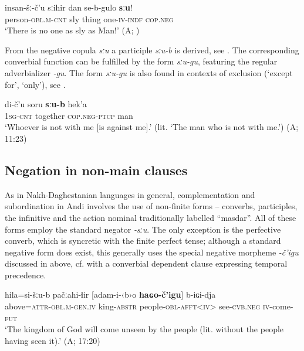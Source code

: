 \documentclass[output=paper,colorlinks=true, citecolor=brown]{langscibook}
\begin{document}
\ea\label{ex:and:29} 
    \gll insan{}-šː{}-č’u sːihir dan se{}-b{}-gulo \textbf{sːu}!\\
          person\textsc{{}-obl.m}{}-\textsc{cnt} sly thing one-\textsc{iv-indf} \textsc{cop.neg}\\
    \glt ‘There is no one as sly as Man!’ (A; )
\z 

From the negative copula \textit{sːu} a participle \textit{sːu-b} is derived, see . The corresponding converbial function can be fulfilled by the form \textit{sːu-gu}, featuring the regular adverbializer \textit{{}-gu}. The form \textit{sːu-gu} is also found in contexts of exclusion (‘except for’, ‘only’), see .

\ea\label{ex:and:30}
    \gll di{}-č’u soru \textbf{sːu{}-b} hek’a\\
          \textsc{1sg}-\textsc{cnt} together \textsc{cop.neg-ptcp} man \\
    \glt ‘Whoever is not with me [is against me].’ (lit. ‘The man who is not with me.’)  (A;  11:23)
\z 

\subsection{Negation in non-main clauses} \label{sec:and:2.4}

As in Nakh-Daghestanian languages in general, complementation and subordination in Andi involves the use of non-finite forms – converbs, participles, the infinitive and the action nominal traditionally labelled “masdar”. All of these forms employ the standard negator \textit{\nobreakdash-sːu}. The only exception is the perfective converb, which is syncretic with the finite perfect tense; although a standard negative form does exist, this generally uses the special negative morpheme \textit{\nobreakdash-č’igu} discussed in  above, cf.  with a converbial dependent clause expressing temporal precedence.

\ea
    \label{ex:and:31} 
    \gll hila=si{}-šːu{}-b pačːahi{}-ɬir [adam{}-i{}-‹b›o \textbf{haɢo{}-č’igu}] b-iɢi-dja\\
         above=\textsc{attr-obl.m-gen.iv} king-\textsc{abstr} {\db}people\textsc{{}-obl}{}-\textsc{afft<iv>} see-\textsc{cvb.neg}  \textsc{iv}{}-come-\textsc{fut} \\
    \glt ‘The kingdom of God will come unseen by the people (lit. without the people having seen it).’ (A;  17:20)
\z 
\end{document}
